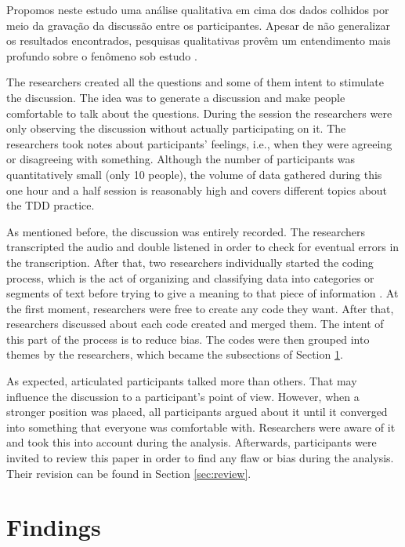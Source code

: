 Propomos neste estudo uma análise qualitativa em cima dos dados 
colhidos por meio da gravação da discussão entre os participantes.
Apesar de não generalizar os resultados encontrados, pesquisas qualitativas
provêm um entendimento mais profundo sobre o fenômeno sob estudo \cite{guidelines-qualitative}.



The researchers created all the questions and some of them intent to stimulate
the discussion. The idea was to generate a discussion and make people
comfortable to talk about the questions.
During the session the researchers were only observing the discussion without
actually participating on it.
The researchers took notes about participants' feelings, i.e., when they
were agreeing or disagreeing with something.
Although the number of participants was quantitatively small (only 10 people),
the volume of data gathered during this one hour and a half session is
reasonably high and covers different topics about the TDD practice.

As mentioned before, the discussion was entirely recorded. The researchers
transcripted the audio and double listened in order to check for eventual errors
in the transcription. After that, two researchers individually started the
coding process, which is the act of organizing and classifying data into
categories or segments of text before trying to give a meaning to that piece of
information \cite{rossman}. At the first moment, researchers were free to
create any code they want. After that, researchers discussed about each code
created and merged them. The intent of this part of the process is to reduce
bias.
The codes were then grouped into themes by the researchers, which became the
subsections of Section \ref{sec:findings}.

As expected, articulated participants talked more than others. That may
influence the discussion to a participant's point of view. However, when a
stronger position was placed, all participants argued about it until it
converged into something that everyone was comfortable with. Researchers were
aware of it and took this into account during the analysis.
Afterwards, participants were invited to review this paper in order to find any
flaw or bias during the analysis. Their revision can be found in Section
\ref{sec:review}.

\section{Findings}
\label{sec:findings}

